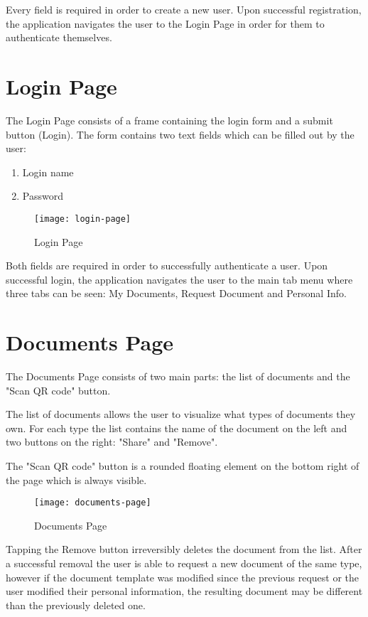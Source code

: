 	Every field is required in order to create a new user.
	Upon successful registration, the application navigates the user to the Login Page in order for them to authenticate themselves.

	\section{Login Page}

	The Login Page consists of a frame containing the login form and a submit button (Login).
	The form contains two text fields which can be filled out by the user:
		
		\begin{enumerate}
			\item Login name
			\item Password
		\end{enumerate}

		\begin{figure}[H]
			\centering
			\texttt{[image: login-page]}				
			\caption{Login Page}
		\end{figure}

	Both fields are required in order to successfully authenticate a user.
	Upon successful login, the application navigates the user to the main tab menu where three tabs can be seen: My Documents, Request Document and Personal Info.

	\section{Documents Page}\label{documents}
	The Documents Page consists of two main parts: the list of documents and the "Scan QR code" button.

	The list of documents allows the user to visualize what types of documents they own.
	For each type the list contains the name of the document on the left and two buttons on the right: "Share" and "Remove".

	The "Scan QR code" button is a rounded floating element on the bottom right of the page which is always visible.

		\begin{figure}[H]
			\centering
			\texttt{[image: documents-page]}				
			\caption{Documents Page}
		\end{figure}

		Tapping the Remove button irreversibly deletes the document from the list.
		After a successful removal the user is able to request a new document of the same type, however if the document template was modified since
		the previous request or the user modified their personal information, the resulting document may be different than the previously deleted one.

